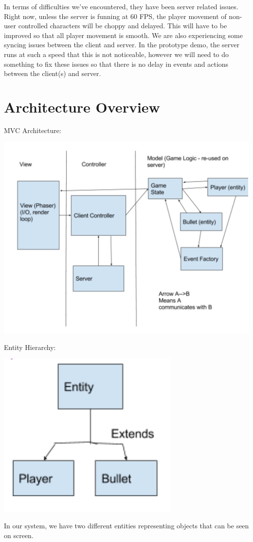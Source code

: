 \documentclass[11pt, oneside]{article}   	%
\begin{document}
In terms of difficulties we've encountered, they have been server related issues.
Right now, unless the server is funning at 60 FPS, the player movement of non-user controlled characters will be choppy and delayed.
This will have to be improved so that all player movement is smooth.
We are also experiencing some syncing issues between the client and server.
In the prototype demo, the server runs at such a speed that this is not noticeable,
however we will need to do something to fix these issues so that there is no delay in events and actions between the client(s) and server.

\clearpage

\section{Architecture Overview}

MVC Architecture:\\
\begin{center}
\includegraphics[scale=0.7]{images/mvc-architecture.png}
\end{center}

Entity Hierarchy:\\
\begin{center}
\includegraphics[scale=0.9]{images/entity-hierarchy.png}
\end{center}
In our system, we have two different entities representing objects that can be seen on screen.\\
\end{document}
